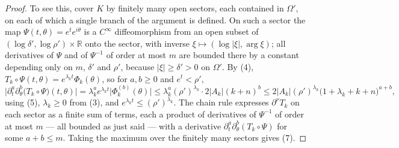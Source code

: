 \begin{proof}
To see this, cover $K$ by finitely many open sectors, each contained in
$\Omega'$, on each of which a single branch of the argument is defined.  On
such a sector the map $\Psi(t,\theta)=e^{t}e^{i\theta}$ is a $C^\infty$
diffeomorphism from an open subset of
$(\log\delta',\log\rho')\times\mathbb{R}$ onto the sector, with inverse
$\xi\mapsto(\log|\xi|,\arg\xi)$; all derivatives of $\Psi$ and of $\Psi^{-1}$
of order at most $m$ are bounded there by a constant depending only on $m$,
$\delta'$ and $\rho'$, because $|\xi|\ge\delta'>0$ on $\Omega'$.  By (4),
$T_k\circ\Psi(t,\theta)=e^{\lambda_kt}\Phi_k(\theta)$, so for $a,b\ge0$ and
$e^{t}<\rho'$,
\[
  \bigl|\partial_t^{a}\partial_\theta^{b}\bigl(T_k\circ\Psi\bigr)(t,\theta)\bigr|
  =\lambda_k^{a}e^{\lambda_kt}\bigl|\Phi_k^{(b)}(\theta)\bigr|
  \le\lambda_k^{a}(\rho')^{\lambda_k}\cdot2|A_k|(k+n)^{b}
  \le2|A_k|(\rho')^{\lambda_k}\bigl(1+\lambda_k+k+n\bigr)^{a+b},
\]
using (5), $\lambda_k\ge0$ from (3), and $e^{\lambda_kt}\le(\rho')^{\lambda_k}$.
The chain rule expresses $\partial^{\nu}T_k$ on each sector as a finite sum of
terms, each a product of derivatives of $\Psi^{-1}$ of order at most $m$ --- all
bounded as just said --- with a derivative
$\partial_t^{a}\partial_\theta^{b}(T_k\circ\Psi)$ for some $a+b\le m$.  Taking
the maximum over the finitely many sectors gives (7).


\end{proof}
